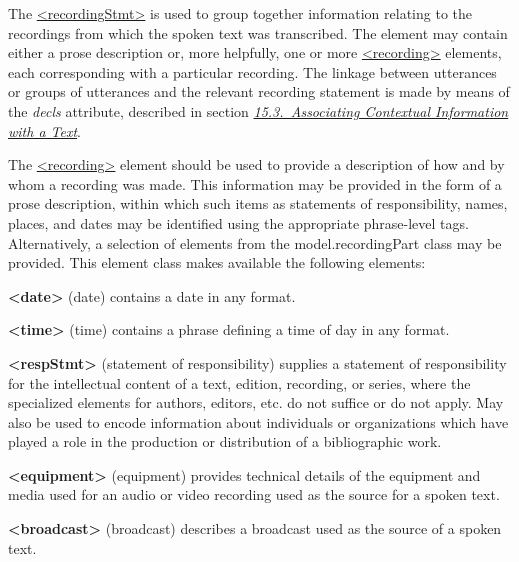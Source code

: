 The \hyperref[TEI.recordingStmt]{<recordingStmt>} is used to group together information relating to the recordings from which the spoken text was transcribed. The element may contain either a prose description or, more helpfully, one or more \hyperref[TEI.recording]{<recording>} elements, each corresponding with a particular recording. The linkage between utterances or groups of utterances and the relevant recording statement is made by means of the {\itshape decls} attribute, described in section \textit{\hyperref[CCAS]{15.3.\ Associating Contextual Information with a Text}}.\par
The \hyperref[TEI.recording]{<recording>} element should be used to provide a description of how and by whom a recording was made. This information may be provided in the form of a prose description, within which such items as statements of responsibility, names, places, and dates may be identified using the appropriate phrase-level tags. Alternatively, a selection of elements from the \textsf{model.recordingPart} class may be provided. This element class makes available the following elements: 
\begin{sansreflist}
  
\item [\textbf{<date>}] (date) contains a date in any format.
\item [\textbf{<time>}] (time) contains a phrase defining a time of day in any format.
\item [\textbf{<respStmt>}] (statement of responsibility) supplies a statement of responsibility for the intellectual content of a text, edition, recording, or series, where the specialized elements for authors, editors, etc. do not suffice or do not apply. May also be used to encode information about individuals or organizations which have played a role in the production or distribution of a bibliographic work.
\item [\textbf{<equipment>}] (equipment) provides technical details of the equipment and media used for an audio or video recording used as the source for a spoken text.
\item [\textbf{<broadcast>}] (broadcast) describes a broadcast used as the source of a spoken text.
\end{sansreflist}
\par
